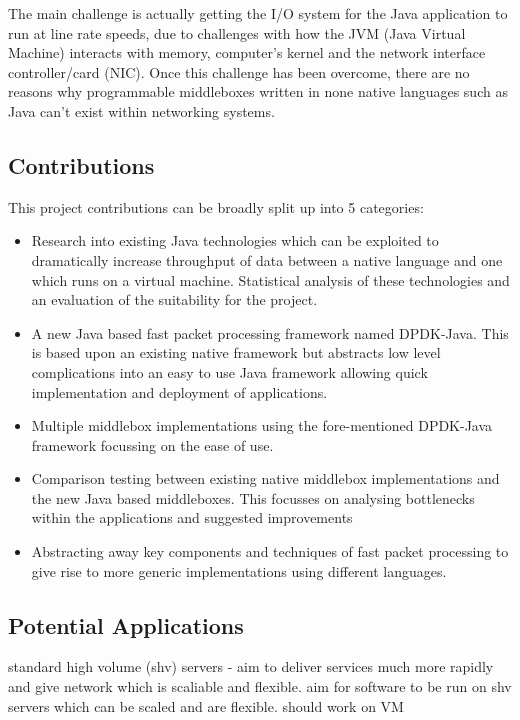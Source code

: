 \documentclass[final_report.tex]{subfiles}
\begin{document}
The main challenge is actually getting the I/O system for the Java application to run at line rate speeds, due to challenges with how the JVM (Java Virtual Machine) interacts with memory, computer's kernel and the network interface controller/card (NIC). Once this challenge has been overcome, there are no reasons why programmable middleboxes written in none native languages such as Java can't exist within networking systems.

\subsection{Contributions}
This project contributions can be broadly split up into 5 categories:

\begin{itemize}
	\item Research into existing Java technologies which can be exploited to dramatically increase throughput of data between a native language and one which runs on a virtual machine. Statistical analysis of these technologies and an evaluation of the suitability for the project.
	\item A new Java based fast packet processing framework named DPDK-Java. This is based upon an existing native framework but abstracts low level complications into an easy to use Java framework allowing quick implementation and deployment of applications.
	\item Multiple middlebox implementations using the fore-mentioned DPDK-Java framework focussing on the ease of use.
	\item Comparison testing between existing native middlebox implementations and the new Java based middleboxes. This focusses on analysing bottlenecks within the applications and suggested improvements
	\item Abstracting away key components and techniques of fast packet processing to give rise to more generic implementations using different languages.
\end{itemize}


\subsection{Potential Applications}
standard high volume (shv) servers - aim to deliver services much more rapidly and give network which is scaliable and flexible. aim for software to be run on shv servers which can be scaled and are flexible. should work on VM

\end{document}

